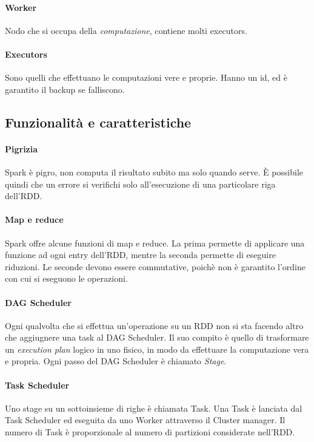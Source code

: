 \paragraph{Worker}
Nodo che si occupa della \emph{computazione}, contiene molti executors.

\paragraph{Executors}
Sono quelli che effettuano le computazioni vere e proprie. Hanno un id, ed è 
garantito il backup se falliscono.

\subsection{Funzionalità e caratteristiche}

\paragraph{Pigrizia}
Spark è pigro, non computa il risultato subito ma solo quando serve. 
È possibile quindi che un errore si verifichi solo all'esecuzione di una particolare 
riga dell'RDD.

\paragraph{Map e reduce}
Spark offre alcune funzioni di map e reduce. La prima permette di applicare una funzione
ad ogni entry dell'RDD, mentre la seconda permette di eseguire riduzioni. Le seconde devono essere
commutative, poichè non è garantito l'ordine con cui si eseguono le operazioni.

\paragraph{DAG Scheduler}
Ogni qualvolta che si effettua un'operazione su un RDD non si sta facendo altro che 
aggiugnere una task al DAG Scheduler. Il suo compito è quello di trasformare un 
\emph{execution plan} logico in uno fisico, in modo da effettuare la computazione vera e propria.
Ogni passo del DAG Scheduler è chiamato \emph{Stage}.

\paragraph{Task Scheduler}
Uno stage su un sottoinsieme di righe è chiamata Task.
Una Task è lanciata dal Task Scheduler ed eseguita da uno Worker 
attraverso il Cluster manager. Il numero 
di Task è proporzionale al numero di partizioni considerate nell'RDD.

